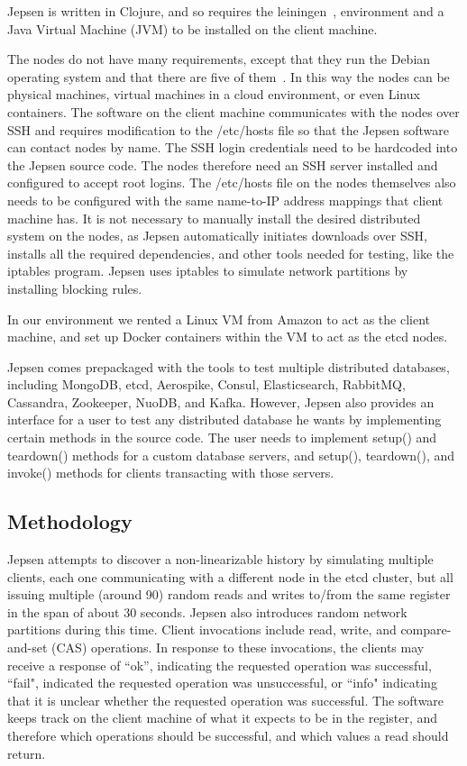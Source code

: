 \documentclass[12pt,conference]{IEEEtran}
\begin{document}
Jepsen is written in Clojure, and so requires the leiningen~\cite{leiningen}, environment and a Java Virtual Machine (JVM) to be installed on the client machine.

The nodes do not have many requirements, except that they run the Debian operating system and that there are five of them~\cite{jepsenGithubWebsite}. In this way the nodes can be physical machines, virtual machines in a cloud environment, or even Linux containers. The software on the client machine communicates with the nodes over SSH and requires modification to the /etc/hosts file so that the Jepsen software can contact nodes by name. The SSH login credentials need to be hardcoded into the Jepsen source code. The nodes therefore need an SSH server installed and configured to accept root logins. The /etc/hosts file on the nodes themselves also needs to be configured with the same name-to-IP address mappings that client machine has. It is not necessary to manually install the desired distributed system on the nodes, as Jepsen automatically initiates downloads over SSH, installs all the required dependencies, and other tools needed for testing, like the iptables program. Jepsen uses iptables to simulate network partitions by installing blocking rules.

In our environment we rented a Linux VM from Amazon to act as the client machine, and set up Docker containers within the VM to act as the etcd nodes.

Jepsen comes prepackaged with the tools to test multiple distributed databases, including MongoDB, etcd, Aerospike, Consul, Elasticsearch, RabbitMQ, Cassandra, Zookeeper, NuoDB, and Kafka. However, Jepsen also provides an interface for a user to test any distributed database he wants by implementing certain methods in the source code. The user needs to implement setup() and teardown() methods for a custom database servers, and setup(), teardown(), and invoke() methods for clients transacting with those servers.

\subsection{Methodology}

Jepsen attempts to discover a non-linearizable history by simulating multiple clients, each one communicating with a different node in the etcd cluster, but all issuing multiple (around 90) random reads and writes to/from the same register in the span of about 30 seconds. Jepsen also introduces random network partitions during this time. Client invocations include read, write, and compare-and-set (CAS) operations. In response to these invocations, the clients may receive a response of ``ok'', indicating the requested operation was successful, ``fail", indicated the requested operation was unsuccessful, or ``info" indicating that it is unclear whether the requested operation was successful. The software keeps track on the client machine of what it expects to be in the register, and therefore which operations should be successful, and which values a read should return.
\end{document}
